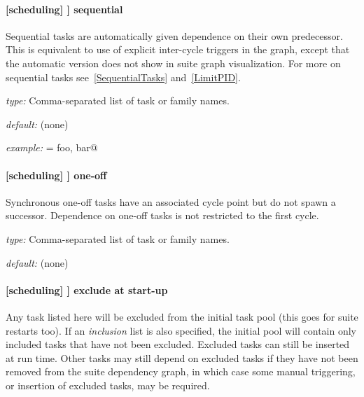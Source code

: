 \paragraph[sequential]{[scheduling] \textrightarrow [[special tasks]] \textrightarrow sequential}

Sequential tasks are automatically given dependence on their own
predecessor. This is equivalent to use of explicit inter-cycle triggers
in the graph, except that the automatic version does not show in suite
graph visualization. For more on sequential tasks see~\ref{SequentialTasks}
and~\ref{LimitPID}.

\begin{myitemize}
    \item {\em type:} Comma-separated list of task or family names.
    \item {\em default:} (none)
    \item {\em example:} \lstinline@sequential = foo, bar@
\end{myitemize}

\paragraph[one-off]{[scheduling] \textrightarrow [[special tasks]] \textrightarrow one-off}

Synchronous one-off tasks have an associated cycle point but do not spawn
a successor.  Dependence on one-off tasks is not restricted to the first cycle.

\begin{myitemize}
\item {\em type:} Comma-separated list of task or family names.
\item {\em default:} (none)
\end{myitemize}

\paragraph[exclude at start-up]{[scheduling] \textrightarrow [[special tasks]] \textrightarrow exclude at start-up}
\label{EASU}

Any task listed here will be excluded from the initial task pool (this
goes for suite restarts too). If an {\em inclusion} list is also
specified, the initial pool will contain only included tasks that have
not been excluded. Excluded tasks can still be inserted at run time.
Other tasks may still depend on excluded tasks if they have not been
removed from the suite dependency graph, in which case some manual
triggering, or insertion of excluded tasks, may be required.


